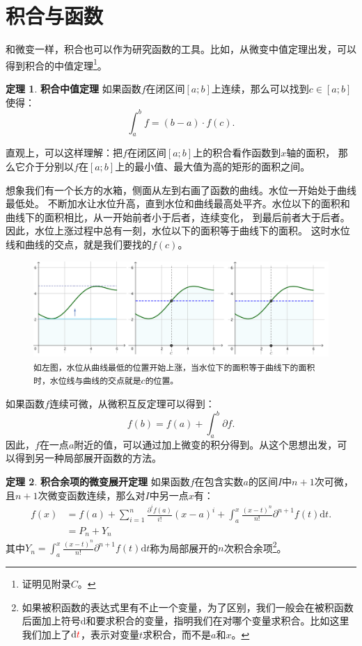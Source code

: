\documentclass[12pt,UTF8]{ctexbook}
\theoremstyle{definition}
\newtheorem{tm}{定理}[section]
\theoremstyle{plain}
\begin{document}
\section{积合与函数}

和微变一样，积合也可以作为研究函数的工具。比如，从微变中值定理出发，可以得到积合的中值定理\footnote{证明见附录$C$。}。

\begin{tm}{\textbf{积合中值定理}}
    如果函数$f$在闭区间$[a; b]$上连续，那么可以找到$c\in[a;b]$使得：
    $$ \int_a^b f = (b - a)\cdot f(c).$$
\end{tm}

直观上，可以这样理解：把$f$在闭区间$[a; b]$上的积合看作函数到$x$轴的面积，
那么它介于分别以$f$在$[a; b]$上的最小值、最大值为高的矩形的面积之间。

想象我们有一个长方的水箱，侧面从左到右画了函数的曲线。水位一开始处于曲线最低处。
不断加水让水位升高，直到水位和曲线最高处平齐。水位以下的面积和曲线下的面积相比，从一开始前者小于后者，连续变化，
到最后前者大于后者。因此，水位上涨过程中总有一刻，水位以下的面积等于曲线下的面积。
这时水位线和曲线的交点，就是我们要找的$f(c)$。

\begin{figure}[h] %
    \vspace{4pt}
    \centering
    \includegraphics[width=\textwidth]{tu/积分中值定理1.png}
    \caption*{\texttt{如左图，水位从曲线最低的位置开始上涨，当水位下的面积等于曲线下的面积时，水位线与曲线的交点就是}$c$\texttt{的位置。}}
\end{figure}

如果函数$f$连续可微，从微积互反定理可以得到：
$$ f(b) = f(a) + \int_a^b \partial f .$$
因此，$f$在一点$a$附近的值，可以通过加上微变的积分得到。从这个思想出发，可以得到另一种局部展开函数的方法。

\begin{tm}{\textbf{积合余项的微变展开定理}}
如果函数$f$在包含实数$a$的区间$I$中$n+1$次可微，且$n+1$次微变函数连续，那么对$I$中另一点$x$有：
\begin{align*}
    f(x) &= f(a) + \sum_{i=1}^n \frac{\partial^i f(a)}{i!} (x - a)^i + \int_a^x \frac{(x - t)^{n}}{n!} \partial^{n+1} f(t)\mathrm{d}t. \\
    &= P_n + Y_n 
\end{align*}
其中$Y_n = \int_a^x \frac{(x - t)^{n}}{n!} \partial^{n+1} f(t)\mathrm{d}t$称为局部展开的$n$次积合余项\footnote{如果被积函数的表达式里有不止一个变量，为了区别，我们一般会在被积函数后面加上符号$\mathrm{d}$和要求积合的变量，指明我们在对哪个变量求积合。比如这里我们加上了$\mathrm{d}{\color{red}t}$，表示对变量$t$求积合，而不是$a$和$x$。}。

\end{tm}
\end{document}
